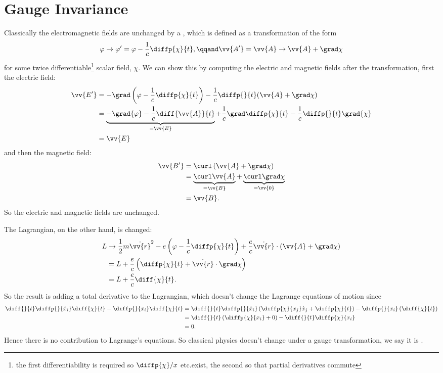 \documentclass[fleqn]{NotesClass}
\newcommand*{\lagrangian}{L}
\begin{document}
    \section{Gauge Invariance}
    Classically the electromagnetic fields are unchanged by a , which is defined as a transformation of the form
    \begin{equation}
        \varphi \to \varphi' = \varphi - \frac{1}{c}\diffp{\chi}{t}, \qqand \vv{A'} = \vv{A} \to \vv{A} + \grad\chi
    \end{equation}
    for some twice differentiable\footnote{the first differentiability is required so \(\diffp{\chi}/{x}\) etc.\@ exist, the second so that partial derivatives commute} scalar field, \(\chi\).
    We can show this by computing the electric and magnetic fields after the transformation, first the electric field:
    \begin{align}
        \vv{E'} &= -\grad\left( \varphi - \frac{1}{c}\diffp{\chi}{t} \right) - \frac{1}{c}\diffp{}{t}( \vv{A} + \grad\chi )\\
        &= \underbrace{-\grad{\varphi} - \frac{1}{c}\diff{\vv{A}}{t}}_{=\vv{E}} + \frac{1}{c}\grad\diffp{\chi}{t} - \frac{1}{c}\diffp{}{t}\grad{\chi}\\
        &= \vv{E}
    \end{align}
    and then the magnetic field:
    \begin{align}
        \vv{B'} &= \curl \left( \vv{A} + \grad\chi \right)\\
        &= \underbrace{\curl\vv{A}\vphantom{\chi}}_{=\vv{B}} + \underbrace{\curl\grad\chi}_{=\vv{0}}\\
        &= \vv{B}.
    \end{align}
    So the electric and magnetic fields are unchanged.
    
    The Lagrangian, on the other hand, is changed:
    \begin{align}
        \lagrangian &\to \frac{1}{2}m\dot{\vv{r}}^2 - e\left( \varphi - \frac{1}{c}\diffp{\chi}{t} \right) + \frac{e}{c}\dot{\vv{r}} \cdot\left( \vv{A} + \grad\chi \right)\\
        &= \lagrangian + \frac{e}{c}\left( \diffp{\chi}{t} + \dot{\vv{r}}\cdot\grad\chi \right)\\
        &= \lagrangian + \frac{e}{c}\diff{\chi}{t}.
    \end{align}
    So the result is adding a total derivative to the Lagrangian, which doesn't change the Lagrange equations of motion since
    \begin{align}
        \diff{}{t}\diffp{}{\dot{x}_i}\diff{\chi}{t} - \diffp{}{x_i}\diff{\chi}{t} &= \diff{}{t}\diffp{}{\dot{x}_i}\left( \diffp{\chi}{x_j}\dot{x}_j + \diffp{\chi}{t} \right) - \diffp{}{x_i}\left( \diff{\chi}{t} \right)\\
        &= \diff{}{t}\left( \diffp{\chi}{x_i} + 0  \right) - \diff{}{t}\diffp{\chi}{x_i}\\
        &= 0.
    \end{align}
    Hence there is no contribution to Lagrange's equations.
    So classical physics doesn't change under a gauge transformation, we say it is .
    
\end{document}
